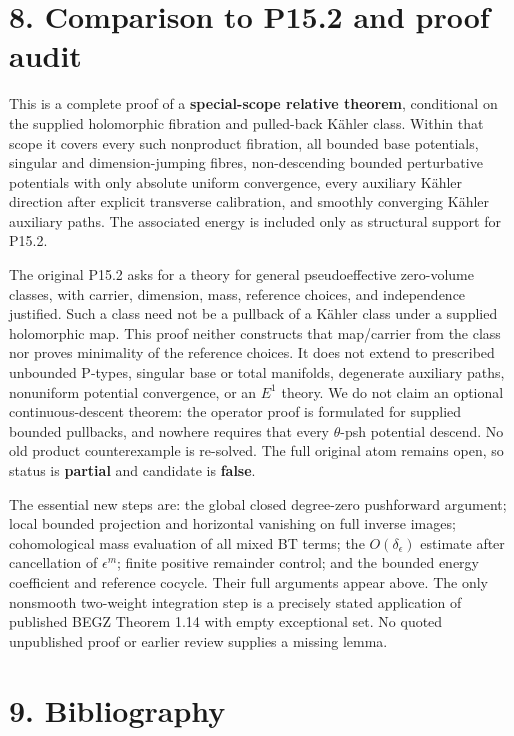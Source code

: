 \documentclass[
  11pt,
]{article}
\begin{document}
\section{8. Comparison to P15.2 and proof audit}\label{comparison-to-p15.2-and-proof-audit}

This is a complete proof of a \textbf{special-scope relative theorem}, conditional on the supplied holomorphic fibration and pulled-back Kähler class. Within that scope it covers every such nonproduct fibration, all bounded base potentials, singular and dimension-jumping fibres, non-descending bounded perturbative potentials with only absolute uniform convergence, every auxiliary Kähler direction after explicit transverse calibration, and smoothly converging Kähler auxiliary paths. The associated energy is included only as structural support for P15.2.

The original P15.2 asks for a theory for general pseudoeffective zero-volume classes, with carrier, dimension, mass, reference choices, and independence justified. Such a class need not be a pullback of a Kähler class under a supplied holomorphic map. This proof neither constructs that map/carrier from the class nor proves minimality of the reference choices. It does not extend to prescribed unbounded P-types, singular base or total manifolds, degenerate auxiliary paths, nonuniform potential convergence, or an \(E^1\) theory. We do not claim an optional continuous-descent theorem: the operator proof is formulated for supplied bounded pullbacks, and nowhere requires that every \(\theta\)-psh potential descend. No old product counterexample is re-solved. The full original atom remains open, so status is \textbf{partial} and candidate is \textbf{false}.

The essential new steps are: the global closed degree-zero pushforward argument; local bounded projection and horizontal vanishing on full inverse images; cohomological mass evaluation of all mixed BT terms; the \(O(\delta_\epsilon)\) estimate after cancellation of \(\epsilon^m\); finite positive remainder control; and the bounded energy coefficient and reference cocycle. Their full arguments appear above. The only nonsmooth two-weight integration step is a precisely stated application of published BEGZ Theorem 1.14 with empty exceptional set. No quoted unpublished proof or earlier review supplies a missing lemma.

\section{9. Bibliography}\label{bibliography}
\end{document}

